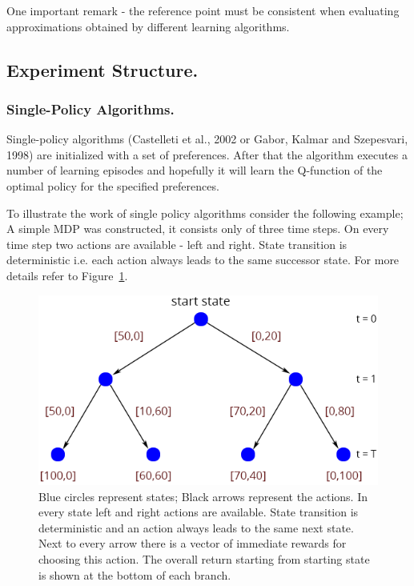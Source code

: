 One important remark - the reference point must be consistent when evaluating approximations obtained by different learning algorithms. \\

\subsection{Experiment Structure.}

\subsubsection{Single-Policy Algorithms.}

Single-policy algorithms (Castelleti et al., 2002\nocite{castelletti2002reinforcement} or Gabor, Kalmar and Szepesvari, 1998\nocite{gabor1998multi}) are initialized with a set of preferences. After that the algorithm executes a number of learning episodes and hopefully it will learn the Q-function of the optimal policy for the specified preferences.

To illustrate the work of single policy algorithms consider the following example; A simple MDP was constructed, it consists only of three time steps. On every time step two actions are available - left and right. State transition is deterministic i.e. each action always leads to the same successor state. For more details refer to Figure~\ref{fig:decisionTree}.\\

\begin{figure}[ht]
\centering
\includegraphics[scale=0.6]{decisionTree.png}
\caption{Blue circles represent states; Black arrows represent the actions. In every state left and right actions are available. State transition is deterministic and an action always leads to the same next state. Next to every arrow there is a vector of immediate rewards for choosing this action. The overall return starting from starting state is shown at the bottom of each branch.}
\label{fig:decisionTree}
\end{figure}

